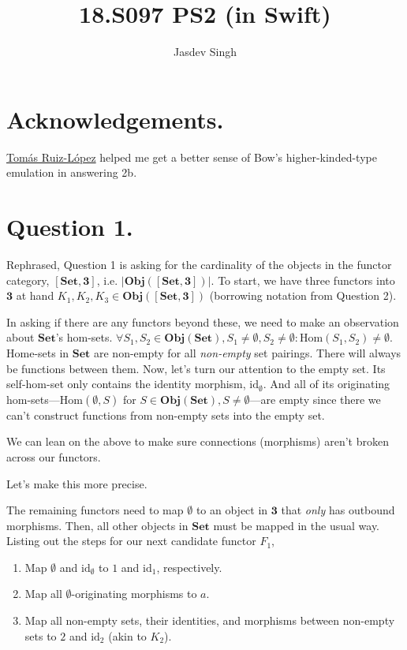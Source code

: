 \documentclass{article}
\title{18.S097 PS2 (in Swift)}
\author{Jasdev Singh}
\begin{document}
\maketitle

\section*{Acknowledgements.}

\href{https://twitter.com/tomasruizlopez}{Tomás Ruiz-López} helped me get a better sense of Bow’s higher-kinded-type emulation in answering 2b.

\section*{Question 1.}

Rephrased, Question 1 is asking for the cardinality of the objects in the functor category, $[\textbf{Set}, \textbf{3}]$, i.e. $|\textbf{Obj}([\textbf{Set}, \textbf{3}])|$. To start, we have three functors into $\textbf{3}$ at hand $K_1, K_2, K_3 \in \textbf{Obj}([\textbf{Set}, \textbf{3}])$ (borrowing notation from Question 2).

In asking if there are any functors beyond these, we need to make an observation about $\textbf{Set}$’s hom-sets. $\forall S_1, S_2 \in \textbf{Obj}(\textbf{Set}), S_1 \neq \emptyset, S_2 \neq \emptyset: \textrm{Hom}(S_1, S_2) \neq \emptyset$. Home-sets in $\textbf{Set}$ are non-empty for all \textit{non-empty} set pairings. There will always be functions between them.
Now, let's turn our attention to the empty set. Its self-hom-set only contains the identity morphism, $\textrm{id}_{\emptyset}$. And all of its originating hom-sets—$\textrm{Hom}(\emptyset, S)$ for $S \in \textbf{Obj}(\textbf{Set}), S \neq \emptyset$—are empty since there we can’t construct functions from non-empty sets into the empty set.

We can lean on the above to make sure connections (morphisms) aren’t broken across our functors.

Let’s make this more precise.

The remaining functors need to map $\emptyset$ to an object in $\textbf{3}$ that \textit{only} has outbound morphisms. Then, all other objects in $\textbf{Set}$ must be mapped in the usual way. Listing out the steps for our next candidate functor $F_1$,

\begin{enumerate}[label=(\alph*)]

\item Map $\emptyset$ and $\textrm{id}_{\emptyset}$ to $1$ and $\textrm{id}_1$, respectively.

\item Map all $\emptyset$-originating morphisms to $a$.

\item Map all non-empty sets, their identities, and morphisms between non-empty sets to $2$ and $\textrm{id}_2$ (akin to $K_2$).

\end{enumerate}
\end{document}
